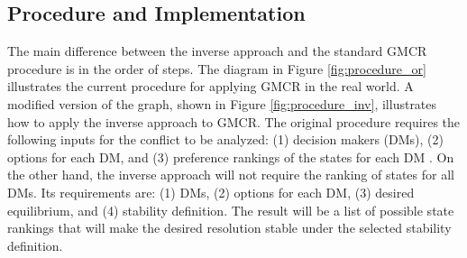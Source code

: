 \documentclass[letterpaper,12pt,titlepage,oneside,final]{book}
\begin{document}
\subsection{Procedure and Implementation}

The main difference between the inverse approach and the standard GMCR procedure is in the order of steps. The diagram in Figure \ref{fig:procedure_or} illustrates the current procedure for applying GMCR in the real world. A modified version of the graph, shown in Figure \ref{fig:procedure_inv}, illustrates how to apply the inverse approach to GMCR. The original procedure requires the following inputs for the conflict to be analyzed: (1) decision makers (DMs), (2) options for each DM, and (3) preference rankings of the states for each DM \citep{Fang1989,fang1993}. On the other hand, the inverse approach will not require the ranking of states for all DMs. Its requirements are: (1) DMs, (2) options for each DM, (3) desired equilibrium, and (4) stability definition. The result will be a list of possible state rankings that will make the desired resolution stable under the selected stability definition.
\end{document}
